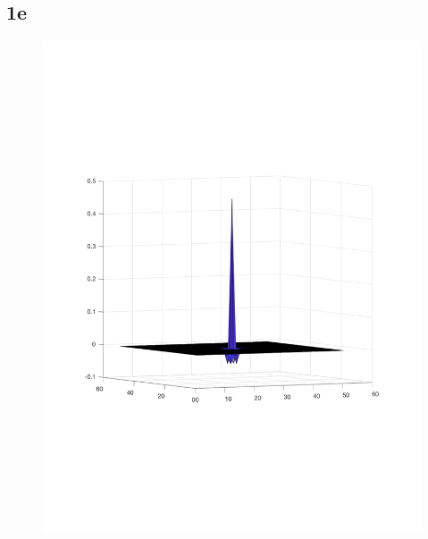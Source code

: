 \documentclass[]{article}
\begin{document}
\subsection*{1e}
\begin{figure}[H]
    \centering
    \includegraphics{problem1Esurf.pdf}
    \label{fig:my_label}
\end{figure}
\end{document}
